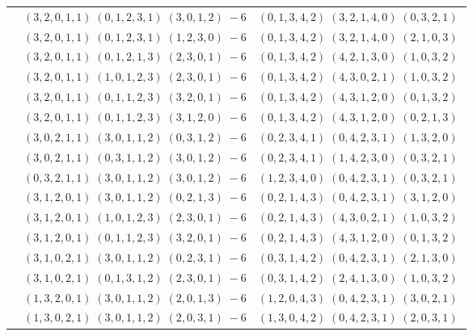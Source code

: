 \documentclass[11pt]{article}
\begin{document}
\begin{longtable}[l]{|c|c|c|}
 \cline{2-3} 
 & $(3 ,2 ,0 ,1 ,1) \;(0 ,1 ,2 ,3 ,1) \;(3 ,0 ,1 ,2) \;-6$ & $(0 ,1 ,3 ,4 ,2) \;(3 ,2 ,1 ,4 ,0) \;(0 ,3 ,2 ,1) \;$\\ 
 \cline{2-3} 
 & $(3 ,2 ,0 ,1 ,1) \;(0 ,1 ,2 ,3 ,1) \;(1 ,2 ,3 ,0) \;-6$ & $(0 ,1 ,3 ,4 ,2) \;(3 ,2 ,1 ,4 ,0) \;(2 ,1 ,0 ,3) \;$\\ 
 \cline{2-3} 
 & $(3 ,2 ,0 ,1 ,1) \;(0 ,1 ,2 ,1 ,3) \;(2 ,3 ,0 ,1) \;-6$ & $(0 ,1 ,3 ,4 ,2) \;(4 ,2 ,1 ,3 ,0) \;(1 ,0 ,3 ,2) \;$\\ 
 \cline{2-3} 
 & $(3 ,2 ,0 ,1 ,1) \;(1 ,0 ,1 ,2 ,3) \;(2 ,3 ,0 ,1) \;-6$ & $(0 ,1 ,3 ,4 ,2) \;(4 ,3 ,0 ,2 ,1) \;(1 ,0 ,3 ,2) \;$\\ 
 \cline{2-3} 
 & $(3 ,2 ,0 ,1 ,1) \;(0 ,1 ,1 ,2 ,3) \;(3 ,2 ,0 ,1) \;-6$ & $(0 ,1 ,3 ,4 ,2) \;(4 ,3 ,1 ,2 ,0) \;(0 ,1 ,3 ,2) \;$\\ 
 \cline{2-3} 
 & $(3 ,2 ,0 ,1 ,1) \;(0 ,1 ,1 ,2 ,3) \;(3 ,1 ,2 ,0) \;-6$ & $(0 ,1 ,3 ,4 ,2) \;(4 ,3 ,1 ,2 ,0) \;(0 ,2 ,1 ,3) \;$\\ 
 \cline{2-3} 
 & $(3 ,0 ,2 ,1 ,1) \;(3 ,0 ,1 ,1 ,2) \;(0 ,3 ,1 ,2) \;-6$ & $(0 ,2 ,3 ,4 ,1) \;(0 ,4 ,2 ,3 ,1) \;(1 ,3 ,2 ,0) \;$\\ 
 \cline{2-3} 
 & $(3 ,0 ,2 ,1 ,1) \;(0 ,3 ,1 ,1 ,2) \;(3 ,0 ,1 ,2) \;-6$ & $(0 ,2 ,3 ,4 ,1) \;(1 ,4 ,2 ,3 ,0) \;(0 ,3 ,2 ,1) \;$\\ 
 \cline{2-3} 
 & $(0 ,3 ,2 ,1 ,1) \;(3 ,0 ,1 ,1 ,2) \;(3 ,0 ,1 ,2) \;-6$ & $(1 ,2 ,3 ,4 ,0) \;(0 ,4 ,2 ,3 ,1) \;(0 ,3 ,2 ,1) \;$\\ 
 \cline{2-3} 
 & $(3 ,1 ,2 ,0 ,1) \;(3 ,0 ,1 ,1 ,2) \;(0 ,2 ,1 ,3) \;-6$ & $(0 ,2 ,1 ,4 ,3) \;(0 ,4 ,2 ,3 ,1) \;(3 ,1 ,2 ,0) \;$\\ 
 \cline{2-3} 
 & $(3 ,1 ,2 ,0 ,1) \;(1 ,0 ,1 ,2 ,3) \;(2 ,3 ,0 ,1) \;-6$ & $(0 ,2 ,1 ,4 ,3) \;(4 ,3 ,0 ,2 ,1) \;(1 ,0 ,3 ,2) \;$\\ 
 \cline{2-3} 
 & $(3 ,1 ,2 ,0 ,1) \;(0 ,1 ,1 ,2 ,3) \;(3 ,2 ,0 ,1) \;-6$ & $(0 ,2 ,1 ,4 ,3) \;(4 ,3 ,1 ,2 ,0) \;(0 ,1 ,3 ,2) \;$\\ 
 \cline{2-3} 
 & $(3 ,1 ,0 ,2 ,1) \;(3 ,0 ,1 ,1 ,2) \;(0 ,2 ,3 ,1) \;-6$ & $(0 ,3 ,1 ,4 ,2) \;(0 ,4 ,2 ,3 ,1) \;(2 ,1 ,3 ,0) \;$\\ 
 \cline{2-3} 
 & $(3 ,1 ,0 ,2 ,1) \;(0 ,1 ,3 ,1 ,2) \;(2 ,3 ,0 ,1) \;-6$ & $(0 ,3 ,1 ,4 ,2) \;(2 ,4 ,1 ,3 ,0) \;(1 ,0 ,3 ,2) \;$\\ 
 \cline{2-3} 
 & $(1 ,3 ,2 ,0 ,1) \;(3 ,0 ,1 ,1 ,2) \;(2 ,0 ,1 ,3) \;-6$ & $(1 ,2 ,0 ,4 ,3) \;(0 ,4 ,2 ,3 ,1) \;(3 ,0 ,2 ,1) \;$\\ 
 \cline{2-3} 
 & $(1 ,3 ,0 ,2 ,1) \;(3 ,0 ,1 ,1 ,2) \;(2 ,0 ,3 ,1) \;-6$ & $(1 ,3 ,0 ,4 ,2) \;(0 ,4 ,2 ,3 ,1) \;(2 ,0 ,3 ,1) \;$\\ 

\end{longtable}
\end{document}
